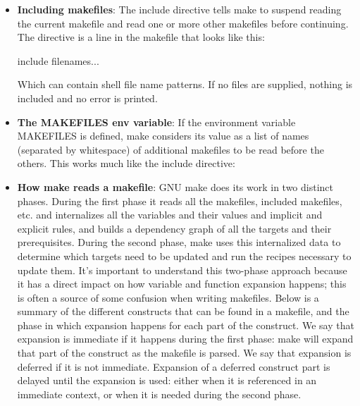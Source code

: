 \documentclass{report}
\begin{document}
\begin{itemize}
\begin{itemize}
                \item GNUmakefile
                \item makefile
                \item Makefile
            \end{itemize}
            GNUmakefile will not be understood by other versions of make. You can specify another name with \texttt{-f (--file)} 
        \item \textbf{Including makefiles}: The include directive tells make to suspend reading the current makefile and read one or more other makefiles before continuing. The directive is a line in the makefile that looks like this:
            \bigbreak \noindent 
            \begin{bashcode}
            include filenames...
            \end{bashcode}
            \bigbreak \noindent 
            Which can contain shell file name patterns. If no files are supplied, nothing is included and no error is printed.
        \item \textbf{The MAKEFILES env variable}: If the environment variable MAKEFILES is defined, make considers its value as a list of names (separated by whitespace) of additional makefiles to be read before the others. This works much like the include directive:
        \item \textbf{How make reads a makefile}: GNU make does its work in two distinct phases. During the first phase it reads all the makefiles, included makefiles, etc. and internalizes all the variables and their values and implicit and explicit rules, and builds a dependency graph of all the targets and their prerequisites. During the second phase, make uses this internalized data to determine which targets need to be updated and run the recipes necessary to update them.
            \bigbreak \noindent 
            It’s important to understand this two-phase approach because it has a direct impact on how variable and function expansion happens; this is often a source of some confusion when writing makefiles. Below is a summary of the different constructs that can be found in a makefile, and the phase in which expansion happens for each part of the construct.
            \bigbreak \noindent 
            We say that expansion is immediate if it happens during the first phase: make will expand that part of the construct as the makefile is parsed. We say that expansion is deferred if it is not immediate. Expansion of a deferred construct part is delayed until the expansion is used: either when it is referenced in an immediate context, or when it is needed during the second phase.

\end{itemize}
\end{document}
